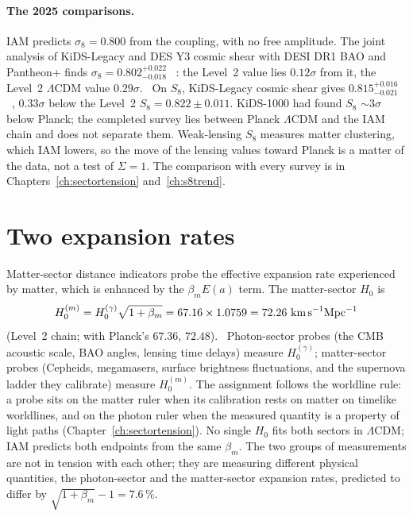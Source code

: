 \paragraph{The 2025 comparisons.} IAM predicts $\sigma_8=0.800$ from the coupling, with no free amplitude. The joint analysis of KiDS-Legacy and DES Y3
cosmic shear with DESI DR1 BAO and Pantheon+ finds $\sigma_8=0.802^{+0.022}_{-0.018}$~\cite{Stolzner2025} \observed: the Level~2 value lies $0.12\sigma$ from
it, the Level~2 $\Lambda$CDM value $0.29\sigma$. \calc\ On $S_8$, KiDS-Legacy cosmic shear gives $0.815^{+0.016}_{-0.021}$~\cite{Wright2025}, $0.33\sigma$ below
the Level~2 $S_8=0.822\pm0.011$. KiDS-1000 had found $S_8$ $\sim3\sigma$ below Planck; the completed survey lies between Planck $\Lambda$CDM and the IAM chain
and does not separate them. Weak-lensing $S_8$ measures matter clustering, which IAM lowers, so the move of the lensing values toward Planck is a matter of
the data, not a test of $\Sigma=1$. The comparison with every survey is in Chapters~\ref{ch:sectortension} and~\ref{ch:s8trend}.

\section{Two expansion rates}\label{sec:vc_h0}
Matter-sector distance indicators probe the effective expansion rate experienced by matter, which is enhanced by the $\beta_mE(a)$ term. The matter-sector
$H_0$ is
\begin{equation}
H_0^{(m)}=H_0^{(\gamma)}\sqrt{1+\beta_m}=67.16\times1.0759=72.26\ \text{km\,s}^{-1}\text{Mpc}^{-1}\label{eq:vc_h0}
\end{equation}
(Level~2 chain; with Planck's $67.36$, $72.48$). \derived\ Photon-sector probes (the CMB acoustic scale, BAO angles, lensing time delays) measure
$H_0^{(\gamma)}$; matter-sector probes (Cepheids, megamasers, surface brightness fluctuations, and the supernova ladder they calibrate) measure $H_0^{(m)}$.
The assignment follows the worldline rule: a probe sits on the matter ruler when its calibration rests on matter on timelike worldlines, and on the photon
ruler when the measured quantity is a property of light paths (Chapter~\ref{ch:sectortension}). No single $H_0$ fits both sectors in $\Lambda$CDM; IAM
predicts both endpoints from the same $\beta_m$. The two groups of measurements are not in tension with each other; they are measuring different physical
quantities, the photon-sector and the matter-sector expansion rates, predicted to differ by $\sqrt{1+\beta_m}-1=7.6\,\%$. \interp

